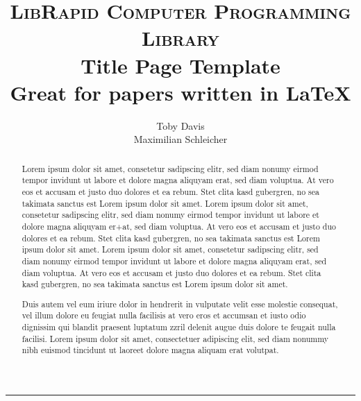 \documentclass[10pt,a4paper]{article}
\title{
\textsc{LibRapid Computer Programming Library}\\[2.2cm]


{\LARGE \bfseries
Title Page Template}\\
{\Large\bfseries
Great for papers written in \LaTeX}
}
\author{Toby Davis\\[0.2cm] Maximilian Schleicher}
\date{\monthyeardate}
\begin{document}
\maketitle
\thispagestyle{empty}
\vspace{0.5cm}
\hrule
\vspace{1cm}
\begin{abstract} %
Lorem ipsum dolor sit amet, consetetur sadipscing elitr, sed diam nonumy eirmod tempor invidunt ut labore et dolore magna aliquyam erat, sed diam voluptua. At vero eos et accusam et justo duo dolores et ea rebum. Stet clita kasd gubergren, no sea takimata sanctus est Lorem ipsum dolor sit amet. Lorem ipsum dolor sit amet, consetetur sadipscing elitr, sed diam nonumy eirmod tempor invidunt ut labore et dolore magna aliquyam er+at, sed diam voluptua. At vero eos et accusam et justo duo dolores et ea rebum. Stet clita kasd gubergren, no sea takimata sanctus est Lorem ipsum dolor sit amet. Lorem ipsum dolor sit amet, consetetur sadipscing elitr, sed diam nonumy eirmod tempor invidunt ut labore et dolore magna aliquyam erat, sed diam voluptua. At vero eos et accusam et justo duo dolores et ea rebum. Stet clita kasd gubergren, no sea takimata sanctus est Lorem ipsum dolor sit amet.   

Duis autem vel eum iriure dolor in hendrerit in vulputate velit esse molestie consequat, vel illum dolore eu feugiat nulla facilisis at vero eros et accumsan et iusto odio dignissim qui blandit praesent luptatum zzril delenit augue duis dolore te feugait nulla facilisi. Lorem ipsum dolor sit amet, consectetuer adipiscing elit, sed diam nonummy nibh euismod tincidunt ut laoreet dolore magna aliquam erat volutpat.
\end{abstract}
\vfill
\newpage
\end{document}
